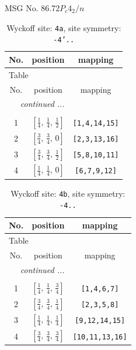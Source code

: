\documentclass[fleqn,8pt]{jsarticle}
\begin{document}
\setcounter{MaxMatrixCols}{32}

\renewcommand{\tablename}{Table~}
\renewcommand{\figurename}{Figure~}
\begin{center}
\LARGE
MSG No. 86.72\quad$P_{c}4_{2}/n$
\end{center}
\renewcommand{\arraystretch}{1.2}
\begin{longtable}{ccc}
\caption{Wyckoff site: {\tt 4a}, site symmetry: {\tt -4'..}}
 \\
 \hline \hline
No. & position & mapping \\ \hline \endfirsthead

\multicolumn{2}{l}{\tablename\ \thetable{}} \\
 \hline \hline
No. & position & mapping \\ \hline \endhead

 \hline \hline
\multicolumn{2}{r}{\footnotesize\it continued ...} \\ \endfoot

 \hline \hline
\multicolumn{2}{r}{} \\ \endlastfoot

1 & $\left[ \frac{1}{4},\, \frac{1}{4},\, \frac{1}{2} \right]$ & {\tt [1,4,14,15]} \\ \hline
2 & $\left[ \frac{3}{4},\, \frac{3}{4},\, 0 \right]$ & {\tt [2,3,13,16]} \\ \hline
3 & $\left[ \frac{3}{4},\, \frac{3}{4},\, \frac{1}{2} \right]$ & {\tt [5,8,10,11]} \\ \hline
4 & $\left[ \frac{1}{4},\, \frac{1}{4},\, 0 \right]$ & {\tt [6,7,9,12]} \\
\end{longtable}
\renewcommand{\arraystretch}{1.2}
\begin{longtable}{ccc}
\caption{Wyckoff site: {\tt 4b}, site symmetry: {\tt -4..}}
 \\
 \hline \hline
No. & position & mapping \\ \hline \endfirsthead

\multicolumn{2}{l}{\tablename\ \thetable{}} \\
 \hline \hline
No. & position & mapping \\ \hline \endhead

 \hline \hline
\multicolumn{2}{r}{\footnotesize\it continued ...} \\ \endfoot

 \hline \hline
\multicolumn{2}{r}{} \\ \endlastfoot

1 & $\left[ \frac{1}{4},\, \frac{1}{4},\, \frac{3}{4} \right]$ & {\tt [1,4,6,7]} \\ \hline
2 & $\left[ \frac{3}{4},\, \frac{3}{4},\, \frac{1}{4} \right]$ & {\tt [2,3,5,8]} \\ \hline
3 & $\left[ \frac{1}{4},\, \frac{1}{4},\, \frac{1}{4} \right]$ & {\tt [9,12,14,15]} \\ \hline
4 & $\left[ \frac{3}{4},\, \frac{3}{4},\, \frac{3}{4} \right]$ & {\tt [10,11,13,16]} \\
\end{longtable}
\end{document}
